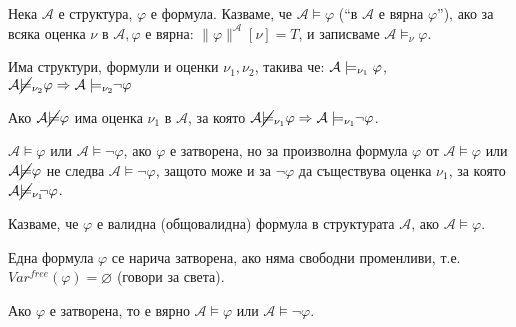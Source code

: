\documentclass{article}
\begin{document}
\begin{mydef}
Нека $\mathcal{A}$ е структура, $\varphi$ е формула. Казваме, че $\mathcal{A} \models \varphi$ (``в $\mathcal{A}$ е вярна $\varphi$''), ако за всяка оценка $\nu$ в $\mathcal{A}, \varphi$ е вярна: $\|\varphi\|^\mathcal{A}[\nu] = T$, и записваме $\mathcal{A} \models_\nu \varphi$.

\begin{remark}
Има структури, формули и оценки $\nu_1, \nu_2$, такива че: $\\ \mathcal{A} \models_{\nu_1} \varphi$, $\mathcal{A} \cancel{\models}_{\nu_2} \varphi \Rightarrow \mathcal{A} \models_{\nu_2} \!\!\neg\varphi$
\end{remark}

\begin{remark}
Ако $\mathcal{A} \cancel{\models} \varphi$ има оценка $\nu_1$ в $\mathcal{A}$, за която $\mathcal{A} \cancel{\models}_{\nu_1} \varphi \Rightarrow \mathcal{A} \models_{\nu_1} \!\!\neg\varphi$.
\end{remark}

\begin{remark}
$\mathcal{A} \models \varphi$ или $\mathcal{A} \models \neg\varphi$, ако $\varphi$ е затворена, но за произволна формула $\varphi$ от $\mathcal{A} \models \varphi$ или $\mathcal{A} \cancel{\models} \varphi$ не следва $\mathcal{A} \models \neg\varphi$, защото може и за $\neg\varphi$ да съществува оценка $\nu_1$, за която $\mathcal{A} \cancel{\models}_{\nu_1} \!\!\neg\varphi$.
\end{remark}

\end{mydef}

\begin{mydef}
Казваме, че $\varphi$ е валидна (общовалидна) формула в структурата $\mathcal{A}$, ако $\mathcal{A} \models \varphi$.
\end{mydef}

\begin{mydef}
Една формула $\varphi$ се нарича затворена, ако няма свободни променливи, т.е. $Var^{free}(\varphi) = \varnothing$ (говори за света).

\begin{remark}
Ако $\varphi$ е затворена, то е вярно $\mathcal{A} \models \varphi$ или $\mathcal{A} \models \neg\varphi$.
\end{remark}

\end{mydef}
\end{document}
